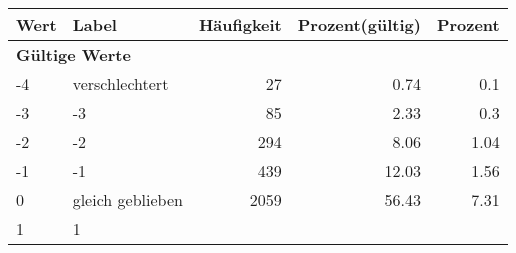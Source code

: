      \begin{longtable}{lXrrr}
     \toprule
     \textbf{Wert} & \textbf{Label} & \textbf{Häufigkeit} & \textbf{Prozent(gültig)} & \textbf{Prozent} \\
     \endhead
     \midrule
     \multicolumn{5}{l}{\textbf{Gültige Werte}}\\

     -4 &
     \multicolumn{1}{X}{ verschlechtert   } &


       \num{27} &
       \num[round-mode=places,round-precision=2]{0.74} &
         \num[round-mode=places,round-precision=2]{0.1} \\

     -3 &
     \multicolumn{1}{X}{ -3   } &


       \num{85} &
       \num[round-mode=places,round-precision=2]{2.33} &
         \num[round-mode=places,round-precision=2]{0.3} \\

     -2 &
     \multicolumn{1}{X}{ -2   } &


       \num{294} &
       \num[round-mode=places,round-precision=2]{8.06} &
         \num[round-mode=places,round-precision=2]{1.04} \\

     -1 &
     \multicolumn{1}{X}{ -1   } &


       \num{439} &
       \num[round-mode=places,round-precision=2]{12.03} &
         \num[round-mode=places,round-precision=2]{1.56} \\

     0 &
     \multicolumn{1}{X}{ gleich geblieben   } &


       \num{2059} &
       \num[round-mode=places,round-precision=2]{56.43} &
         \num[round-mode=places,round-precision=2]{7.31} \\

     1 &
     \multicolumn{1}{X}{ 1   } &



\end{longtable}

